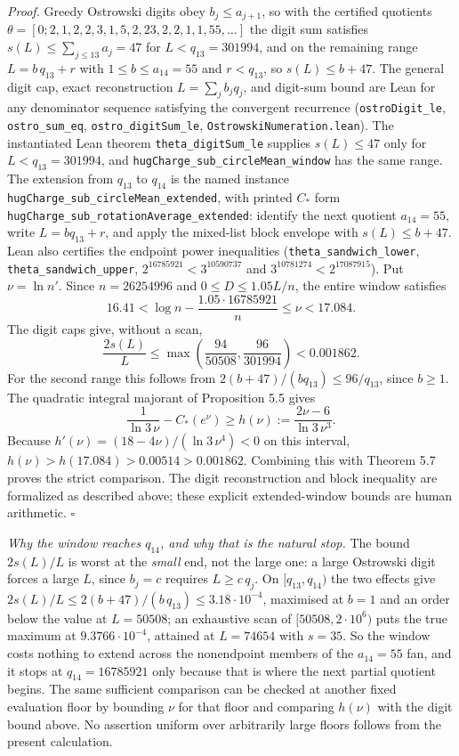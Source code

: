\documentclass[12pt]{article}
\begin{document}
\emph{Proof.} Greedy Ostrowski digits obey \(b_j\le a_{j+1}\), so with
the certified quotients
\(\theta=[0;2,1,2,2,3,1,5,2,23,2,2,1,1,55,\ldots]\) the digit sum
satisfies \(s(L)\le\sum_{j\le13}a_j=47\) for \(L<q_{13}=301994\), and on
the remaining range \(L=b\,q_{13}+r\) with \(1\le b\le a_{14}=55\) and
\(r<q_{13}\), so \(s(L)\le b+47\). The general digit cap, exact
reconstruction \(L=\sum_j b_jq_j\), and digit-sum bound are Lean for any
denominator sequence satisfying the convergent recurrence
(\texttt{\nolinkurl{ostroDigit_le}}, \texttt{\nolinkurl{ostro_sum_eq}},
\texttt{\nolinkurl{ostro_digitSum_le}},
\texttt{\nolinkurl{OstrowskiNumeration.lean}}). The instantiated Lean
theorem \texttt{\nolinkurl{theta_digitSum_le}} supplies \(s(L)\le47\)
only for \(L<q_{13}=301994\), and
\texttt{\nolinkurl{hugCharge_sub_circleMean_window}} has the same range.
The extension from \(q_{13}\) to \(q_{14}\) is the named instance
\texttt{\nolinkurl{hugCharge_sub_circleMean_extended}}, with printed
\(C_*\) form
\texttt{\nolinkurl{hugCharge_sub_rotationAverage_extended}}: identify
the next quotient \(a_{14}=55\), write \(L=bq_{13}+r\), and apply the
mixed-list block envelope with \(s(L)\le b+47\). Lean also certifies the
endpoint power inequalities (\texttt{\nolinkurl{theta_sandwich_lower}},
\texttt{\nolinkurl{theta_sandwich_upper}}, \(2^{16785921}<3^{10590737}\)
and \(3^{10781274}<2^{17087915}\)). Put \(\nu=\ln n'\). Since
\(n=26254996\) and \(0\le D\le1.05L/n\), the entire window satisfies \[
16.41<\log n-\frac{1.05\cdot16785921}{n}\le\nu<17.084.
\] The digit caps give, without a scan, \[
\frac{2s(L)}{L}\le
\max\!\left(\frac{94}{50508},\frac{96}{301994}\right)
<0.001862.
\] For the second range this follows from
\(2(b+47)/(bq_{13})\le96/q_{13}\), since \(b\ge1\). The quadratic
integral majorant of Proposition 5.5 gives \[
\frac1{\ln3\,\nu}-C_*(e^\nu)
\ge h(\nu):=\frac{2\nu-6}{\ln3\,\nu^3}.
\] Because \(h'(\nu)=(18-4\nu)/(\ln3\,\nu^4)<0\) on this interval,
\(h(\nu)>h(17.084)>0.00514>0.001862\). Combining this with Theorem 5.7
proves the strict comparison. The digit reconstruction and block
inequality are formalized as described above; these explicit
extended-window bounds are human arithmetic. \(\square\)

\emph{Why the window reaches \(q_{14}\), and why that is the natural
stop.} The bound \(2s(L)/L\) is worst at the \emph{small} end, not the
large one: a large Ostrowski digit forces a large \(L\), since \(b_j=c\)
requires \(L\ge c\,q_j\). On \([q_{13},q_{14})\) the two effects give
\(2s(L)/L\le 2(b+47)/(b\,q_{13})\le3.18\cdot10^{-4}\), maximised at
\(b=1\) and an order below the value at \(L=50508\); an exhaustive scan
of \([50508,2\cdot10^{6})\) puts the true maximum at
\(9.3766\cdot10^{-4}\), attained at \(L=74654\) with \(s=35\). So the
window costs nothing to extend across the nonendpoint members of the
\(a_{14}=55\) fan, and it stops at \(q_{14}=16785921\) only because that
is where the next partial quotient begins. The same sufficient
comparison can be checked at another fixed evaluation floor by bounding
\(\nu\) for that floor and comparing \(h(\nu)\) with the digit bound
above. No assertion uniform over arbitrarily large floors follows from
the present calculation.
\end{document}
